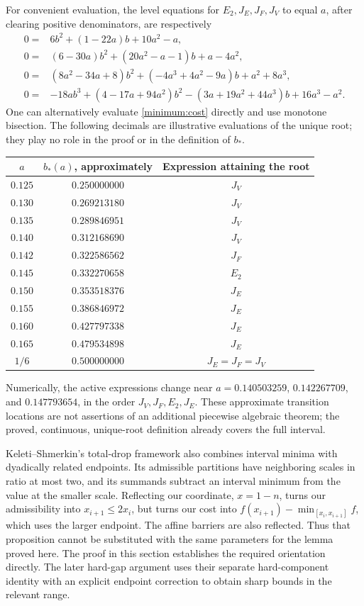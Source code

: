 For convenient evaluation, the level equations for \(E_2,J_E,J_F,J_V\)
to equal \(a\), after clearing positive denominators, are respectively
\begin{align*}
 0={}&6b^2+(1-22a)b+10a^2-a,\\
 0={}&(6-30a)b^2+(20a^2-a-1)b+a-4a^2,\\
 0={}&(8a^2-34a+8)b^2+(-4a^3+4a^2-9a)b+a^2+8a^3,\\
 0={}&-18ab^3+(4-17a+94a^2)b^2
            -(3a+19a^2+44a^3)b+16a^3-a^2.
\end{align*}
One can alternatively evaluate \eqref{minimum:cost} directly and use
monotone bisection. The following decimals are illustrative evaluations of
the unique root; they play no role in the proof or in the definition of
\(b_*\).
\begin{center}
\begin{tabular}{ccc}
\toprule
\(a\)&\(b_*(a)\), approximately&Expression attaining the root\\
\midrule
\(0.125\)&\(0.250000000\)&\(J_V\)\\
\(0.130\)&\(0.269213180\)&\(J_V\)\\
\(0.135\)&\(0.289846951\)&\(J_V\)\\
\(0.140\)&\(0.312168690\)&\(J_V\)\\
\(0.142\)&\(0.322586562\)&\(J_F\)\\
\(0.145\)&\(0.332270658\)&\(E_2\)\\
\(0.150\)&\(0.353518376\)&\(J_E\)\\
\(0.155\)&\(0.386846972\)&\(J_E\)\\
\(0.160\)&\(0.427797338\)&\(J_E\)\\
\(0.165\)&\(0.479534898\)&\(J_E\)\\
\(1/6\)&\(0.500000000\)&\(J_E=J_F=J_V\)\\
\bottomrule
\end{tabular}
\end{center}
Numerically, the active expressions change near
\(a=0.140503259\), \(0.142267709\), and \(0.147793654\), in the
order \(J_V,J_F,E_2,J_E\). These approximate transition locations
are not assertions of an additional piecewise algebraic theorem; the
proved, continuous, unique-root definition already covers the full interval.

\begin{remark}
Keleti--Shmerkin's total-drop framework \cite[Definition 5.1 and
Proposition 5.2]{ks} also combines interval minima with dyadically related
endpoints. Its admissible partitions have neighboring scales in ratio at
most two, and its summands subtract an interval minimum from the value at
the smaller scale. Reflecting our coordinate, \(x=1-n\), turns our
admissibility into \(x_{i+1}\le2x_i\), but turns our cost into
\(f(x_{i+1})-\min_{[x_i,x_{i+1}]}f\), which uses the larger endpoint.
The affine barriers are also reflected. Thus that proposition cannot be
substituted with the same parameters for the lemma proved here. The proof
in this section establishes the required orientation directly. The later
hard-gap argument uses their separate hard-component identity with an
explicit endpoint correction to obtain sharp bounds in the relevant range.
\end{remark}
